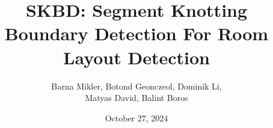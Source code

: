 \documentclass{article}      %
\title{SKBD: Segment Knotting Boundary Detection For Room Layout Detection}
\author{Barna Mikler, Botond Geonczeol, Dominik Li, \\ Matyas David, Balint Boros}
\date{October 27, 2024}
\begin{document}

\maketitle                   %



















\listoffigures

\listoftables

\listofalgorithms

\printbibliography           %
\end{document}
